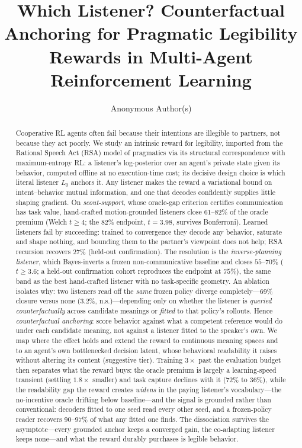 \documentclass[sigconf,review,anonymous]{acmart}
\title{Which Listener? Counterfactual Anchoring for Pragmatic Legibility Rewards in Multi-Agent Reinforcement Learning}
\author{Anonymous Author(s)}
\affiliation{\institution{Anonymous Institution}\city{}\country{}}
\begin{document}
\begin{abstract}
\setlength{\emergencystretch}{2em}%
Cooperative RL agents often fail because their intentions are illegible to partners, not because they act poorly. We study an intrinsic reward for legibility, imported from the Rational Speech Act (RSA) model of pragmatics via its structural correspondence with maximum-entropy RL: a listener's log-posterior over an agent's private state given its behavior, computed offline at no execution-time cost; its decisive design choice is which literal listener $L_0$ anchors it. Any listener makes the reward a variational bound on intent--behavior mutual information, and one that decodes confidently supplies little shaping gradient. On \emph{scout-support}, whose oracle-gap criterion certifies communication has task value, hand-crafted motion-grounded listeners close $61$--$82\%$ of the oracle premium (Welch $t\ge4$; the $82\%$ endpoint, $t{=}3.98$, survives Bonferroni). Learned listeners fail by succeeding: trained to convergence they decode any behavior, saturate and shape nothing, and bounding them to the partner's viewpoint does not help; RSA recursion recovers $27\%$ (held-out confirmation). The resolution is the \emph{inverse-planning listener}, which Bayes-inverts a frozen non-communicative baseline and closes $55$--$70\%$ ($t\ge3.6$; a held-out confirmation cohort reproduces the endpoint at $75\%$), the same band as the best hand-crafted listener with no task-specific geometry. An ablation isolates why: two listeners read off the \emph{same} frozen policy diverge completely---$69\%$ closure versus none ($3.2\%$, n.s.)---depending only on whether the listener is \emph{queried counterfactually} across candidate meanings or \emph{fitted} to that policy's rollouts. Hence \emph{counterfactual anchoring}: score behavior against what a competent reference would do under each candidate meaning, not against a listener fitted to the speaker's own. We map where the effect holds and extend the reward to continuous meaning spaces and to an agent's own bottlenecked decision latent, whose behavioral readability it raises without altering its content (suggestive tier). Training $3\times$ past the evaluation budget then separates what the reward buys: the oracle premium is largely a learning-speed transient (settling $1.8\times$ smaller) and task capture declines with it ($72\%$ to $36\%$), while the readability gap the reward creates \emph{widens} in the paying listener's vocabulary---the no-incentive oracle drifting below baseline---and the signal is grounded rather than conventional: decoders fitted to one seed read every other seed, and a frozen-policy reader recovers $90$--$97\%$ of what any fitted one finds. The dissociation survives the asymptote---every grounded anchor keeps a converged gain, the co-adapting listener keeps none---and what the reward durably purchases is legible behavior.
\end{abstract}
\end{document}
